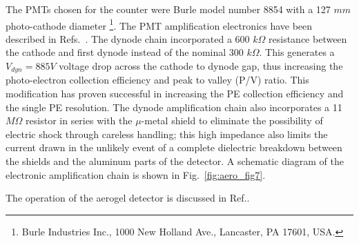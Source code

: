 {The PMTs chosen for the counter were Burle model number 8854 with a 127 $mm$ photo-cathode 
diameter
\footnote{Burle Industries Inc., 1000 New Holland Ave., Lancaster, PA 17601, USA.}.
  The PMT amplification electronics have been described in 
Refs.~\cite{Alexa:1995ne,Lolos:1997vz}.  The dynode chain incorporated a
600 $k\Omega$ resistance between the cathode and first dynode instead of the
nominal 300 $k\Omega$.  This generates a $V_{dyn}=885 V$ voltage drop across the cathode to
dynode gap, thus increasing the photo-electron collection efficiency and peak
to valley (P/V) ratio.  This modification has proven successful in
increasing the PE collection efficiency and the single PE resolution.  The
dynode amplification chain also incorporates a 11 $M\Omega$ resistor in series
with the $\mu$-metal shield to eliminate the possibility of electric shock
through careless handling; this high impedance also limits the current drawn
in the unlikely event of a complete dielectric breakdown between the shields
and the aluminum parts of the detector. A schematic diagram of the electronic 
amplification chain is shown in Fig.~\ref{fig:aero_fig7}. 

The operation of the aerogel detector is discussed in Ref.\cite{Brash:2002vn}.



}
